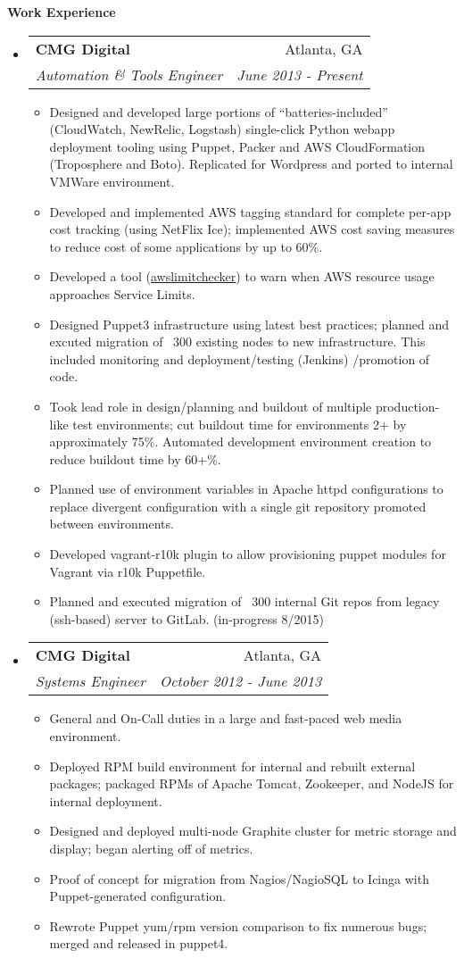 \documentclass[letterpaper,11pt]{article}
\makeatletter
\newcommand{\resitem}[1]{\item #1 \vspace{-2pt}}
\newcommand{\resheading}[1]{{\large \colorbox{mygrey}{\begin{minipage}{\textwidth}{\textbf{#1 \vphantom{p\^{E}}}}\end{minipage}}}}
\newcommand{\ressubheading}[4]{
\begin{tabular*}{7.0in}{l@{\extracolsep{\fill}}r}
		\textbf{#1} & #2 \\
		\textit{#3} & \textit{#4} \\
\end{tabular*}\vspace{-6pt}}
\makeatother
\begin{document}
\resheading{Work Experience}
\begin{itemize}
\item
	\ressubheading{CMG Digital}{Atlanta, GA}{Automation \& Tools Engineer}{June 2013 - Present}
	\begin{itemize}
                \resitem{Designed and developed large portions of ``batteries-included'' (CloudWatch, NewRelic, Logstash) single-click Python webapp deployment tooling using Puppet, Packer and AWS CloudFormation (Troposphere and Boto). Replicated for Wordpress and ported to internal VMWare environment.}
                \resitem{Developed and implemented AWS tagging standard for complete per-app cost tracking (using NetFlix Ice); implemented AWS cost saving measures to reduce cost of some applications by up to 60\%.}
                \resitem{Developed a tool (\href{https://github.com/jantman/awslimitchecker}{awslimitchecker}) to warn when AWS resource usage approaches Service Limits.}
                \resitem{Designed Puppet3 infrastructure using latest best practices; planned and excuted migration of ~300 existing nodes to new infrastructure. This included monitoring and deployment/testing (Jenkins) /promotion of code.}
                \resitem{Took lead role in design/planning and buildout of multiple production-like test environments; cut buildout time for environments 2+ by approximately 75\%. Automated development environment creation to reduce buildout time by 60+\%.}
                \resitem{Planned use of environment variables in Apache httpd configurations to replace divergent configuration with a single git repository promoted between environments.}
                \resitem{Developed vagrant-r10k plugin to allow provisioning puppet modules for Vagrant via r10k Puppetfile.}
                \resitem{Planned and executed migration of ~300 internal Git repos from legacy (ssh-based) server to GitLab. (in-progress 8/2015)}
	\end{itemize}

\item
	\ressubheading{CMG Digital}{Atlanta, GA}{Systems Engineer}{October 2012 - June 2013}
	\begin{itemize}
                \resitem{General and On-Call duties in a large and fast-paced web media environment.}
                \resitem{Deployed RPM build environment for internal and rebuilt external packages; packaged RPMs of Apache Tomcat, Zookeeper, and NodeJS for internal deployment.}
                \resitem{Designed and deployed multi-node Graphite cluster for metric storage and display; began alerting off of metrics.}
                \resitem{Proof of concept for migration from Nagios/NagioSQL to Icinga with Puppet-generated configuration.}
                \resitem{Rewrote Puppet yum/rpm version comparison to fix numerous bugs; merged and released in puppet4.}
	\end{itemize}


\end{itemize}
\end{document}
